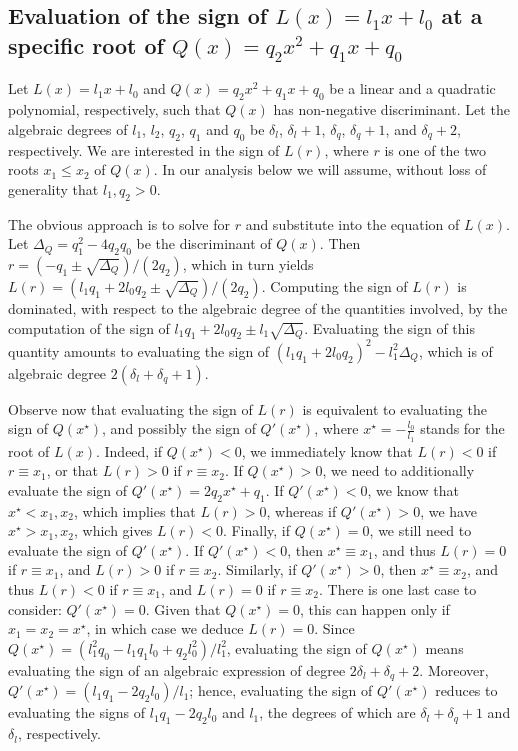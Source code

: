 \documentclass[letterpaper,11pt]{article}
\begin{document}
\subsection{Evaluation of the sign of $L(x)=l_1x+l_0$ at a specific
  root of $Q(x)=q_2x^2+q_1x+q_0$}\label{sec:lqsolve}

Let $L(x)=l_1x+l_0$ and $Q(x)=q_2x^2+q_1x+q_0$ be a linear and a
quadratic polynomial, respectively, such that $Q(x)$ has non-negative
discriminant. Let the algebraic degrees of $l_1$, $l_2$, $q_2$, $q_1$
and $q_0$ be $\delta_l$, $\delta_l+1$, $\delta_q$, $\delta_q+1$, and
$\delta_q+2$, respectively. We are interested in the sign of
$L(r)$, where $r$ is one of the two roots $x_1\leq{}x_2$
of $Q(x)$. In our analysis below we will assume, without loss of
generality that $l_1,q_2>0$.

The obvious approach is to solve for $r$ and substitute into the
equation of $L(x)$. Let $ \Delta_Q=q_1^2-4q_2q_0$ be the discriminant of 
$Q(x)$. Then $r=(-q_1\pm\sqrt{\Delta_Q})/(2q_2)$, which in turn
yields $L(r)=(l_1q_1+2l_0q_2\pm\sqrt{\Delta_Q})/(2q_2)$. Computing
the sign of $L(r)$ is dominated, with respect to the algebraic
degree of the quantities involved, by the computation of the 
sign of $l_1q_1+2l_0q_2\pm{}l_1\sqrt{\Delta_Q}$. Evaluating the sign
of this quantity amounts to evaluating the sign of
$(l_1q_1+2l_0q_2)^2-l_1^2\Delta_Q$, which is of algebraic degree
$2(\delta_l+\delta_q+1)$.

Observe now that evaluating the sign of $L(r)$ is equivalent to
evaluating the sign of $Q(x^\star)$, and possibly the sign of
$Q'(x^\star)$, where $x^\star=-\frac{l_0}{l_1}$ stands for the root of
$L(x)$.
Indeed, if $Q(x^\star)<0$, we immediately know that $L(r)<0$
if $r\equiv{}x_1$, or that $L(r)>0$ if $r\equiv{}x_2$. If
$Q(x^\star)>0$, we need to additionally evaluate the sign of
$Q'(x^\star)=2q_2x^\star+q_1$. If $Q'(x^\star)<0$, we know that
$x^\star<x_1,x_2$, which implies that $L(r)>0$, whereas if
$Q'(x^\star)>0$, we have $x^\star>x_1,x_2$, which gives
$L(r)<0$. Finally, if $Q(x^\star)=0$, we still need to evaluate the
sign of $Q'(x^\star)$. If $Q'(x^\star)<0$, then $x^\star\equiv{}x_1$,
and thus $L(r)=0$ if $r\equiv{}x_1$, and $L(r)>0$ if
$r\equiv{}x_2$. Similarly, if $Q'(x^\star)>0$, then $x^\star\equiv{}x_2$,
and thus $L(r)<0$ if $r\equiv{}x_1$, and $L(r)=0$ if
$r\equiv{}x_2$. There is one last case to consider:
$Q'(x^\star)=0$. Given that $Q(x^\star)=0$, this can happen only if
$x_1=x_2=x^\star$, in which case we deduce $L(r)=0$.
Since $Q(x^\star)=(l_1^2q_0-l_1q_1l_0+q_2l_0^2)/l_1^2$, evaluating
the sign of $Q(x^\star)$ means evaluating the sign of an algebraic
expression of degree $2\delta_l+\delta_q+2$. Moreover,
$Q'(x^\star)=(l_1q_1-2q_2l_0)/l_1$; hence, evaluating the sign of
$Q'(x^\star)$ reduces to evaluating the signs of $l_1q_1-2q_2l_0$ and
$l_1$, the degrees of which are $\delta_l+\delta_q+1$ and $\delta_l$,
respectively. 
\end{document}
